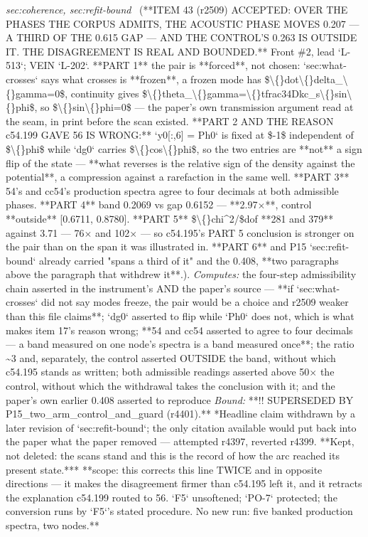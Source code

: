 \begin{description}
\textit{sec:coherence, sec:refit-bound} \ (**ITEM 43 (r2509) ACCEPTED: OVER THE PHASES THE CORPUS ADMITS, THE ACOUSTIC PHASE MOVES 0.207 --- A THIRD OF THE 0.615 GAP --- AND THE CONTROL'S 0.263 IS OUTSIDE IT. THE DISAGREEMENT IS REAL AND BOUNDED.** Front \#2, lead `L-513`; VEIN `L-202`. **PART 1** the pair is **forced**, not chosen: `sec:what-crosses` says what crosses is **frozen**, a frozen mode has \$\textbackslash\{\}dot\textbackslash\{\}delta\_\textbackslash\{\}gamma=0\$, continuity gives \$\textbackslash\{\}theta\_\textbackslash\{\}gamma=\textbackslash\{\}tfrac34Dkc\_s\textbackslash\{\}sin\textbackslash\{\}phi\$, so \$\textbackslash\{\}sin\textbackslash\{\}phi=0\$ --- the paper's own transmission argument read at the seam, in print before the scan existed. **PART 2 AND THE REASON c54.199 GAVE 56 IS WRONG:** `y0[:,6] = Ph0` is fixed at \$-1\$ independent of \$\textbackslash\{\}phi\$ while `dg0` carries \$\textbackslash\{\}cos\textbackslash\{\}phi\$, so the two entries are **not** a sign flip of the state --- **what reverses is the relative sign of the density against the potential**, a compression against a rarefaction in the same well. **PART 3** 54's and cc54's production spectra agree to four decimals at both admissible phases. **PART 4** band 0.2069 vs gap 0.6152 --- **2.97\ensuremath{\times}**, control **outside** [0.6711, 0.8780]. **PART 5** \$\textbackslash\{\}chi\textasciicircum{}2/\$dof **281 and 379** against 3.71 --- 76\ensuremath{\times} and 102\ensuremath{\times} --- so c54.195's PART 5 conclusion is stronger on the pair than on the span it was illustrated in. **PART 6** and P15 `sec:refit-bound` already carried "spans a third of it" and the 0.408, **two paragraphs above the paragraph that withdrew it**.). 
\emph{Computes:} the four-step admissibility chain asserted in the instrument's AND the paper's source --- **if `sec:what-crosses` did not say modes freeze, the pair would be a choice and r2509 weaker than this file claims**; `dg0` asserted to flip while `Ph0` does not, which is what makes item 17's reason wrong; **54 and cc54 asserted to agree to four decimals --- a band measured on one node's spectra is a band measured once**; the ratio \textasciitilde{}3 and, separately, the control asserted OUTSIDE the band, without which c54.195 stands as written; both admissible readings asserted above 50\ensuremath{\times} the control, without which the withdrawal takes the conclusion with it; and the paper's own earlier 0.408 asserted to reproduce
 \emph{Bound:} **!! SUPERSEDED BY P15\_two\_arm\_control\_and\_guard (r4401).** *Headline claim withdrawn by a later revision of `sec:refit-bound`; the only citation available would put back into the paper what the paper removed --- attempted r4397, reverted r4399. **Kept, not deleted: the scans stand and this is the record of how the arc reached its present state.*** **scope: this corrects this line TWICE and in opposite directions --- it makes the disagreement firmer than c54.195 left it, and it retracts the explanation c54.199 routed to 56. `F5` unsoftened; `PO-7` protected; the conversion runs by `F5`'s stated procedure. No new run: five banked production spectra, two nodes.**

\end{description}
